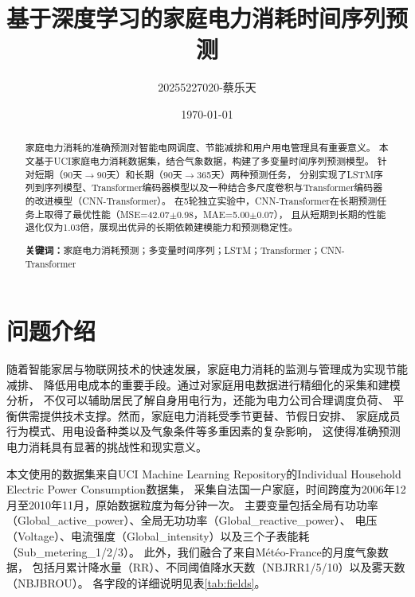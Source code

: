 \documentclass[12pt,a4paper]{ctexart}
\title{\textbf{基于深度学习的家庭电力消耗时间序列预测}}
\author{
    20255227020-蔡乐天
}
\date{\today}
\begin{document}
\maketitle

\begin{abstract}
家庭电力消耗的准确预测对智能电网调度、节能减排和用户用电管理具有重要意义。
本文基于UCI家庭电力消耗数据集，结合气象数据，构建了多变量时间序列预测模型。
针对短期（90天$\to$90天）和长期（90天$\to$365天）两种预测任务，
分别实现了LSTM序列到序列模型、Transformer编码器模型以及一种结合多尺度卷积与Transformer编码器的改进模型（CNN-Transformer）。
在5轮独立实验中，CNN-Transformer在长期预测任务上取得了最优性能（MSE=42.07$\pm$0.98，MAE=5.00$\pm$0.07），
且从短期到长期的性能退化仅为1.03倍，展现出优异的长期依赖建模能力和预测稳定性。

\textbf{关键词：}家庭电力消耗预测；多变量时间序列；LSTM；Transformer；CNN-Transformer
\end{abstract}

\section{问题介绍}

随着智能家居与物联网技术的快速发展，家庭电力消耗的监测与管理成为实现节能减排、
降低用电成本的重要手段。通过对家庭用电数据进行精细化的采集和建模分析，
不仅可以辅助居民了解自身用电行为，还能为电力公司合理调度负荷、
平衡供需提供技术支撑。然而，家庭电力消耗受季节更替、节假日安排、
家庭成员行为模式、用电设备种类以及气象条件等多重因素的复杂影响，
这使得准确预测电力消耗具有显著的挑战性和现实意义。

本文使用的数据集来自UCI Machine Learning Repository的Individual Household Electric Power Consumption数据集\cite{uci_dataset}，
采集自法国一户家庭，时间跨度为2006年12月至2010年11月，原始数据粒度为每分钟一次。
主要变量包括全局有功功率（Global\_active\_power）、全局无功功率（Global\_reactive\_power）、
电压（Voltage）、电流强度（Global\_intensity）以及三个子表能耗（Sub\_metering\_1/2/3）。
此外，我们融合了来自M\'et\'eo-France的月度气象数据\cite{weather_data}，
包括月累计降水量（RR）、不同阈值降水天数（NBJRR1/5/10）以及雾天数（NBJBROU）。
各字段的详细说明见表\ref{tab:fields}。
\end{document}
